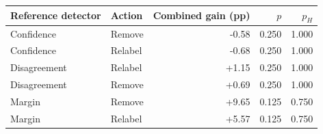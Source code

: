\begin{tabular}{llrrr}
\toprule
Reference detector & Action & Combined gain (pp) & $p$ & $p_H$ \\
\midrule
Confidence & Remove & -0.58 & 0.250 & 1.000 \\
Confidence & Relabel & -0.68 & 0.250 & 1.000 \\
Disagreement & Relabel & +1.15 & 0.250 & 1.000 \\
Disagreement & Remove & +0.69 & 0.250 & 1.000 \\
Margin & Remove & +9.65 & 0.125 & 0.750 \\
Margin & Relabel & +5.57 & 0.125 & 0.750 \\
\bottomrule
\end{tabular}
